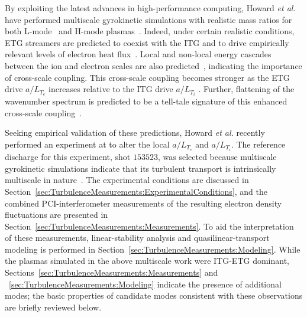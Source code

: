 By exploiting the latest advances in high-performance computing,
Howard \emph{et al.} have performed
multiscale gyrokinetic simulations
with realistic mass ratios
for both L-mode~\cite{howard_pp14, howard_nf16, howard_pp16} and
H-mode plasmas~\cite{howard_ppcf18, holland_nf17}.
Indeed, under certain realistic conditions,
ETG streamers are predicted
to coexist with the ITG and
to drive empirically relevant levels
of electron heat flux~\cite{howard_pp14}.
Local and non-local energy cascades
between the ion and electron scales
are also predicted~\cite{howard_nf16},
indicating the importance of cross-scale coupling.
This cross-scale coupling becomes stronger
as the ETG drive $a / L_{T_e}$ increases
relative to the ITG drive $a / L_{T_i}$
\cite{howard_pp16}.
Further, flattening of the wavenumber spectrum
is predicted to be a tell-tale signature
of this enhanced cross-scale coupling~\cite{howard_pp16}.

Seeking empirical validation of these predictions,
Howard \emph{et al.} recently performed an experiment at \diiid\space
to alter the local $a / L_{T_e}$ and $a / L_{T_i}$.
The reference discharge for this experiment,
\diiid\space shot $153523$,
was selected because multiscale gyrokinetic simulations
indicate that its turbulent transport
is intrinsically multiscale in nature~\cite{holland_nf17}.
The experimental conditions are discussed
in Section~\ref{sec:TurbulenceMeasurements:ExperimentalConditions}, and
the combined PCI-interferometer measurements
of the resulting electron density fluctuations are presented
in Section~\ref{sec:TurbulenceMeasurements:Measurements}.
To aid the interpretation of these measurements,
linear-stability analysis and quasilinear-transport modeling
is performed in Section~\ref{sec:TurbulenceMeasurements:Modeling}.
While the plasmas simulated in the above multiscale work
were ITG-ETG dominant,
Sections~\ref{sec:TurbulenceMeasurements:Measurements} and
~\ref{sec:TurbulenceMeasurements:Modeling}
indicate the presence of additional modes;
the basic properties of candidate modes
consistent with these observations
are briefly reviewed below.

